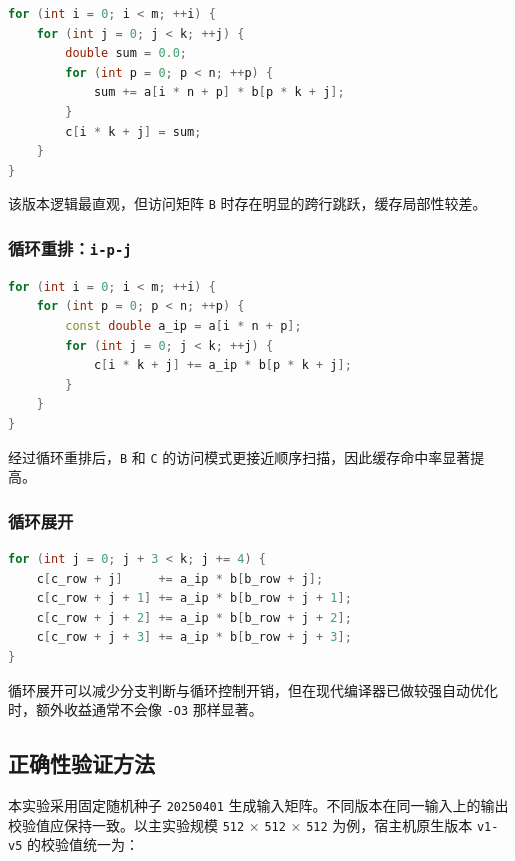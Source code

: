 \documentclass[UTF8,a4paper,12pt]{ctexart}
\begin{document}
\begin{lstlisting}[language=C++]
for (int i = 0; i < m; ++i) {
    for (int j = 0; j < k; ++j) {
        double sum = 0.0;
        for (int p = 0; p < n; ++p) {
            sum += a[i * n + p] * b[p * k + j];
        }
        c[i * k + j] = sum;
    }
}
\end{lstlisting}

该版本逻辑最直观，但访问矩阵 \texttt{B} 时存在明显的跨行跳跃，缓存局部性较差。

\subsubsection{循环重排：\texttt{i-p-j}}

\begin{lstlisting}[language=C++]
for (int i = 0; i < m; ++i) {
    for (int p = 0; p < n; ++p) {
        const double a_ip = a[i * n + p];
        for (int j = 0; j < k; ++j) {
            c[i * k + j] += a_ip * b[p * k + j];
        }
    }
}
\end{lstlisting}

经过循环重排后，\texttt{B} 和 \texttt{C} 的访问模式更接近顺序扫描，因此缓存命中率显著提高。

\subsubsection{循环展开}

\begin{lstlisting}[language=C++]
for (int j = 0; j + 3 < k; j += 4) {
    c[c_row + j]     += a_ip * b[b_row + j];
    c[c_row + j + 1] += a_ip * b[b_row + j + 1];
    c[c_row + j + 2] += a_ip * b[b_row + j + 2];
    c[c_row + j + 3] += a_ip * b[b_row + j + 3];
}
\end{lstlisting}

循环展开可以减少分支判断与循环控制开销，但在现代编译器已做较强自动优化时，额外收益通常不会像 \texttt{-O3} 那样显著。

\subsection{正确性验证方法}

本实验采用固定随机种子 \texttt{20250401} 生成输入矩阵。不同版本在同一输入上的输出校验值应保持一致。以主实验规模 \texttt{512} $\times$ \texttt{512} $\times$ \texttt{512} 为例，宿主机原生版本 \texttt{v1-v5} 的校验值统一为：

\begin{center}
\end{center}
\end{document}
